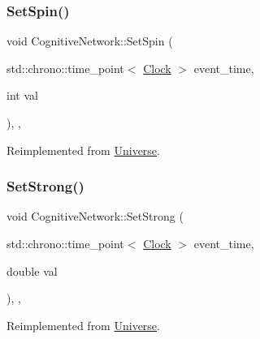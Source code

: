 \mbox{\label{classCognitiveNetwork_a3fc6d08413bfd4350f94d6f2627eedc7}} 
\subsubsection{\texorpdfstring{Set\+Spin()}{SetSpin()}}
{\footnotesize\ttfamily void Cognitive\+Network\+::\+Set\+Spin (\begin{DoxyParamCaption}\item[{std\+::chrono\+::time\+\_\+point$<$ \mbox{\hyperlink{universe_8h_a0ef8d951d1ca5ab3cfaf7ab4c7a6fd80}{Clock}} $>$}]{event\+\_\+time,  }\item[{int}]{val }\end{DoxyParamCaption})\hspace{0.3cm}{\ttfamily [inline]}, {\ttfamily [final]}, {\ttfamily [virtual]}}



Reimplemented from \mbox{\hyperlink{classUniverse_ae2ae1c3b3e4cde2c18f5f6a814761ec8}{Universe}}.

\mbox{\label{classCognitiveNetwork_a50f2a12c9873e623d6247318b041ba30}} 
\subsubsection{\texorpdfstring{Set\+Strong()}{SetStrong()}}
{\footnotesize\ttfamily void Cognitive\+Network\+::\+Set\+Strong (\begin{DoxyParamCaption}\item[{std\+::chrono\+::time\+\_\+point$<$ \mbox{\hyperlink{universe_8h_a0ef8d951d1ca5ab3cfaf7ab4c7a6fd80}{Clock}} $>$}]{event\+\_\+time,  }\item[{double}]{val }\end{DoxyParamCaption})\hspace{0.3cm}{\ttfamily [inline]}, {\ttfamily [final]}, {\ttfamily [virtual]}}



Reimplemented from \mbox{\hyperlink{classUniverse_a5946c8f3d4cda305f3ecd10df21a2f94}{Universe}}.

\mbox{\label{classCognitiveNetwork_ac54286eea279f5caa98b642b9084fd55}} 
